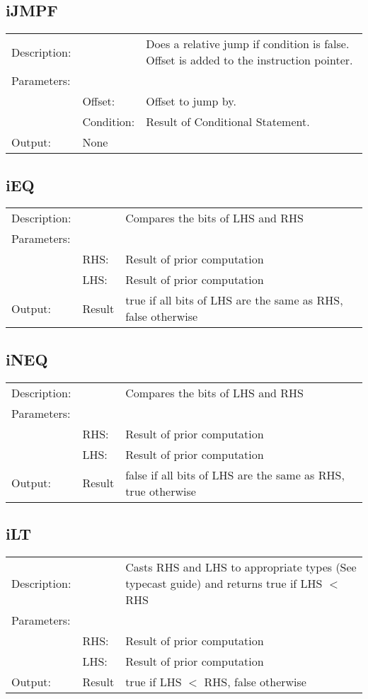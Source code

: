 \documentclass{report}
\begin{document}
\subsection{iJMPF}
\begin{tabular}{l l p{10cm}}
Description: & ~    & Does a relative jump if condition is false. Offset is added to the instruction pointer.\\
Parameters:  & ~ & ~ \\
~			 & Offset: & Offset to jump by.\\
~			 & Condition: & Result of Conditional Statement.\\
Output:      & None & ~ \\
\end{tabular}

\subsection{iEQ}
\begin{tabular}{l l p{10cm}}
Description: & ~    & Compares the bits of LHS and RHS\\
Parameters:  & ~ & ~ \\
~			 & RHS: & Result of prior computation\\
~			 & LHS: & Result of prior computation\\
Output:      & Result & true if all bits of LHS are the same as RHS, false otherwise                        \\
\end{tabular}

\subsection{iNEQ}
\begin{tabular}{l l p{10cm}}
Description: & ~    & Compares the bits of LHS and RHS\\
Parameters:  & ~ & ~\\
~			 & RHS: & Result of prior computation\\
~			 & LHS: & Result of prior computation\\
Output:      & Result & false if all bits of LHS are the same as RHS, true otherwise\\
\end{tabular}

\subsection{iLT}
\begin{tabular}{l l p{10cm}}
Description: & ~    & Casts RHS and LHS to appropriate types (See typecast guide) and returns true if LHS $<$ RHS\\
Parameters:  & ~ & ~ \\
~			 & RHS: & Result of prior computation\\
~			 & LHS: & Result of prior computation\\
Output:      & Result & true if LHS $<$ RHS, false otherwise\\
\end{tabular}
\end{document}
